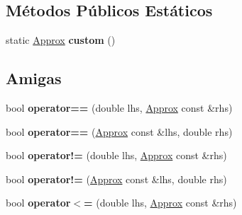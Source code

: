 \subsection*{Métodos Públicos Estáticos}
\begin{DoxyCompactItemize}
\item 
static \hyperlink{classCatch_1_1Detail_1_1Approx}{Approx} {\bfseries custom} ()\hypertarget{classCatch_1_1Detail_1_1Approx_aaf86dc0ee92272ac2d9839197a07951d}{}\label{classCatch_1_1Detail_1_1Approx_aaf86dc0ee92272ac2d9839197a07951d}

\end{DoxyCompactItemize}
\subsection*{Amigas}
\begin{DoxyCompactItemize}
\item 
bool {\bfseries operator==} (double lhs, \hyperlink{classCatch_1_1Detail_1_1Approx}{Approx} const \&rhs)\hypertarget{classCatch_1_1Detail_1_1Approx_ac766f044f1c63f0c5997982baefd9049}{}\label{classCatch_1_1Detail_1_1Approx_ac766f044f1c63f0c5997982baefd9049}

\item 
bool {\bfseries operator==} (\hyperlink{classCatch_1_1Detail_1_1Approx}{Approx} const \&lhs, double rhs)\hypertarget{classCatch_1_1Detail_1_1Approx_a35999631e6cef569f9da9f3fa910db22}{}\label{classCatch_1_1Detail_1_1Approx_a35999631e6cef569f9da9f3fa910db22}

\item 
bool {\bfseries operator!=} (double lhs, \hyperlink{classCatch_1_1Detail_1_1Approx}{Approx} const \&rhs)\hypertarget{classCatch_1_1Detail_1_1Approx_a83b3763569a7ecc143c335b630be0e47}{}\label{classCatch_1_1Detail_1_1Approx_a83b3763569a7ecc143c335b630be0e47}

\item 
bool {\bfseries operator!=} (\hyperlink{classCatch_1_1Detail_1_1Approx}{Approx} const \&lhs, double rhs)\hypertarget{classCatch_1_1Detail_1_1Approx_a7497ef839f8026cc0edd6269a80f3e09}{}\label{classCatch_1_1Detail_1_1Approx_a7497ef839f8026cc0edd6269a80f3e09}

\item 
bool {\bfseries operator$<$=} (double lhs, \hyperlink{classCatch_1_1Detail_1_1Approx}{Approx} const \&rhs)\hypertarget{classCatch_1_1Detail_1_1Approx_aa2bfad80c8c138eac1f0b56910a7d3f2}{}\label{classCatch_1_1Detail_1_1Approx_aa2bfad80c8c138eac1f0b56910a7d3f2}


\end{DoxyCompactItemize}
